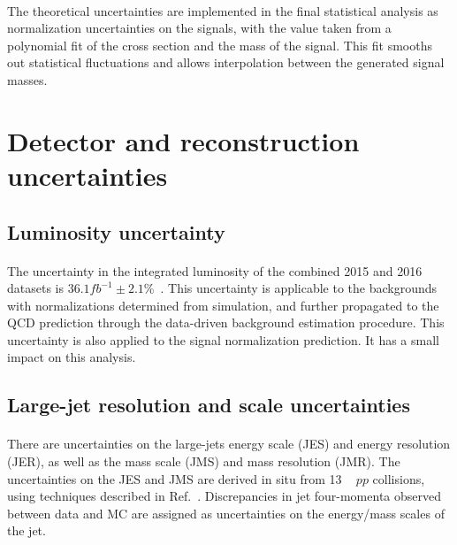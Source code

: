 \paragraph{}
The theoretical uncertainties are implemented in the final statistical analysis as normalization uncertainties on the signals, with the value taken from a polynomial fit of the cross section and the mass of the signal.
This fit smooths out statistical fluctuations and allows interpolation between the generated signal masses.


\section{Detector and reconstruction uncertainties}
\label{sec:boosted-systematics-detector}
\subsection{Luminosity uncertainty} 
\paragraph{}
The uncertainty in the integrated luminosity of the combined 2015 and 2016 datasets is $36.1 fb^{-1}\pm2.1$\%~\cite{LumiCiteUP}.
This uncertainty is applicable to the backgrounds with normalizations determined from simulation, and further propagated to the QCD prediction through the data-driven background estimation procedure.
This uncertainty is also applied to the signal normalization prediction.
It has a small impact on this analysis. 

\subsection{Large-\R jet resolution and scale uncertainties} 
\paragraph{}
There are uncertainties on the large-\R jets energy scale (JES) and energy resolution (JER), as well as the mass scale (JMS) and mass resolution (JMR).
The uncertainties on the JES and JMS are derived in situ from 13 \TeV~ $pp$ collisions, using techniques described in Ref.~\cite{JetMassAndSubstructure}. 
Discrepancies in jet four-momenta observed between data and MC are assigned as uncertainties on the energy/mass scales of the jet.

